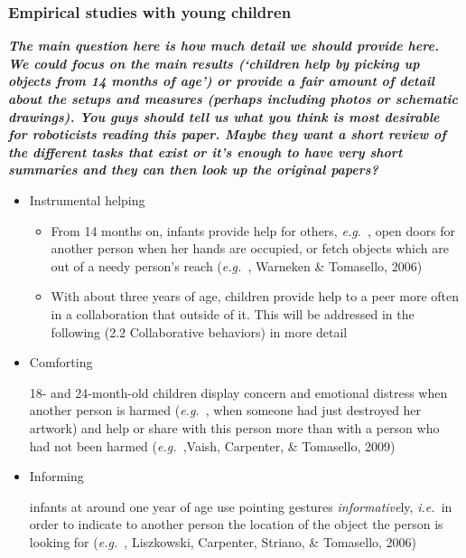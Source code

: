 \documentclass{article}
\newcommand{\ie}{{\textit{i.e.~}}}
\newcommand{\eg}{{\textit{e.g.~}}}
\begin{document}
\subsubsection{Empirical studies with young children}

{\bfseries\itshape The main question here is how much detail we should provide
here. We could focus on the main results ({}`children help by picking up
objects from 14 months of age{}') or provide a fair amount of detail about the
setups and measures (perhaps including photos or schematic drawings). You guys
should tell us what you think is most desirable for roboticists reading this
paper. Maybe they want a short review of the different tasks that exist or
it{}'s enough to have very short summaries and they can then look up the
original papers?}

\begin{itemize}

\item Instrumental helping 

	\begin{itemize}

	\item From 14 months on, infants provide help for others, \eg, open doors
	for another person when her hands are occupied, or fetch objects which are
	out of a needy person{}'s reach (\eg, Warneken \& Tomasello, 2006)

	\item With about three years of age, children provide help to a peer more
	often in a collaboration that outside of it.  This will be addressed in the
	following (2.2 Collaborative behaviors) in more detail

	\end{itemize}

\item Comforting

	18- and 24-month-old children display concern and emotional distress when
	another person is harmed (\eg, when someone had just destroyed her artwork)
	and help or share with this person more than with a person who had not been
	harmed (\eg,Vaish, Carpenter, \& Tomasello, 2009) 

\item Informing  

	infants at around one year of age use pointing gestures
	\textit{informative}ly, \ie in order to indicate to another person the
	location of the object the person is looking for (\eg, Liszkowski,
	Carpenter, Striano, \& Tomasello, 2006) 


\end{itemize}
\end{document}
